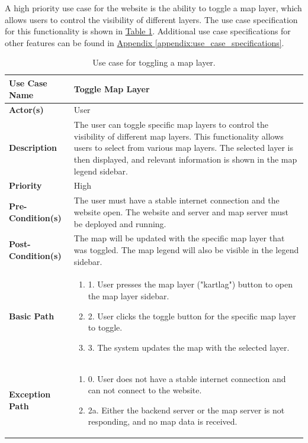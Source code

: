 A high priority use case for the website is the ability to toggle a map layer, which allows users to control the visibility of different layers. The use case specification for this functionality is shown in \hyperref[tab:use_case_toggle_layer]{Table \ref*{tab:use_case_toggle_layer}}. Additional use case specifications for other features can be found in \hyperref[appendix:use_case_specifications]{Appendix \ref*{appendix:use_case_specifications}}.
\begin{table}[h]
    \centering
    \begin{tabularx}{\textwidth}{|l|X|}
        \hline
        \rowcolor{gray!20}
        \textbf{Use Case Name} & Toggle Map Layer \\
        \hline
        \textbf{Actor(s)} & User \\
        \hline
        \textbf{Description} & The user can toggle specific map layers to control the visibility of different map layers. This functionality allows users to select from various map layers. The selected layer is then displayed, and relevant information is shown in the map legend sidebar. \\
        \hline
        \textbf{Priority} & High \\
        \hline
        \textbf{Pre-Condition(s)} & The user must have a stable internet connection and the website open. The website and server and map server must be deployed and running.\\
        \hline
        \textbf{Post-Condition(s)} & The map will be updated with the specific map layer that was toggled. The map legend will also be visible in the legend sidebar. \\
        \hline
        \textbf{Basic Path} &  
        \begin{enumerate}[label=,left=0pt]
            \item 1. User presses the map layer ("kartlag") button to open the map layer sidebar.
            \item 2. User clicks the toggle button for the specific map layer to toggle.
            \item 3. The system updates the map with the selected layer.
        \end{enumerate} \\
        \hline
        \textbf{Exception Path} & 
        \begin{enumerate}[label=,left=0pt]
            \item 0. User does not have a stable internet connection and can not connect to the website.
            \item 2a. Either the backend server or the map server is not responding, and no map data is received.
        \end{enumerate} \\
        \hline
    \end{tabularx}
    \caption[Use Case Specification: Toggle Map Layer]{Use case for toggling a map layer.}
    \label{tab:use_case_toggle_layer}
\end{table}